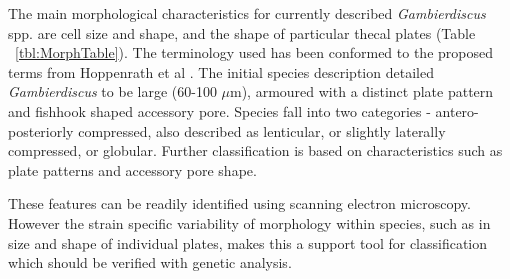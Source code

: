 \documentclass[12pt]{article}
\begin{document}
The main morphological characteristics for currently described \emph{Gambierdiscus} spp. are cell size and shape, and the shape of particular thecal plates (Table ~\ref{tbl:MorphTable}). The terminology used has been conformed to the proposed terms from Hoppenrath et al \cite{hoppenrath2013taxonomy}. The initial species description detailed \emph{Gambierdiscus} to be large (60-100 $\mu$m), armoured with a distinct plate pattern and fishhook shaped accessory pore. Species fall into two categories - antero-posteriorly compressed, also described as lenticular, or slightly laterally compressed, or globular. Further classification is based on characteristics such as plate patterns and accessory pore shape. %

These features can be readily identified using scanning electron microscopy. However the strain specific variability of morphology within species, such as in size and shape of individual plates, makes this a support tool for classification which should be verified with genetic analysis. \\
\end{document}
